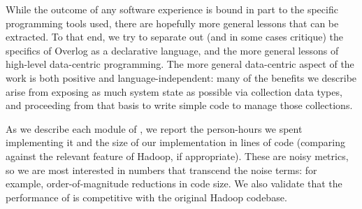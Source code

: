 While the outcome of any software experience is bound in part to the specific
programming tools used, there are hopefully more general lessons that can be
extracted.  To that end, we try to separate out (and in some cases critique) the
specifics of Overlog as a declarative language, and the more general lessons of high-level data-centric
programming.  
The more
general data-centric aspect of the work is both positive and language-independent: many of the benefits
we describe arise from exposing as much system state as possible via collection
data types, and proceeding from that basis to write simple code to manage those
collections.%


As we describe each module of \BOOMA, we report the person-hours we spent
implementing it and the size of our implementation in lines of code (comparing
against the relevant feature of Hadoop, if appropriate). These are noisy
metrics, so we are most interested in numbers that transcend the noise terms:
for example, order-of-magnitude reductions in code size.  We also validate that
the performance of \BOOMA is competitive with the original Hadoop codebase.



% 



% 

